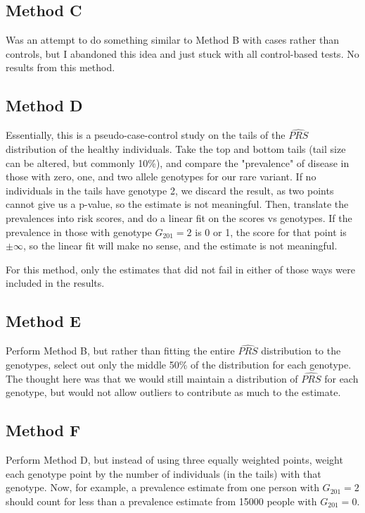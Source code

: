 \documentclass[11pt]{article} %
\begin{document}
\subsection{Method C}
Was an attempt to do something similar to Method B with cases rather than controls, but I abandoned this idea and just stuck with all control-based tests. No results from this method.

\subsection{Method D}
Essentially, this is a pseudo-case-control study on the tails of the $\widehat{PRS}$ distribution of the healthy individuals. Take the top and bottom tails (tail size can be altered, but commonly 10\%), and compare the "prevalence" of disease in those with zero, one, and two allele genotypes for our rare variant. If no individuals in the tails have genotype 2, we discard the result, as two points cannot give us a p-value, so the estimate is not meaningful. Then, translate the prevalences into risk scores, and do a linear fit on the scores vs genotypes. If the prevalence in those with genotype $G_{201} = 2$ is 0 or 1, the score for that point is $\pm \infty$, so the linear fit will make no sense, and the estimate is not meaningful.

For this method, only the estimates that did not fail in either of those ways were included in the results.

\subsection{Method E}
Perform Method B, but rather than fitting the entire $\widehat{PRS}$ distribution to the genotypes, select out only the middle 50\% of the distribution for each genotype. The thought here was that we would still maintain a distribution of $\widehat{PRS}$ for each genotype, but would not allow outliers to contribute as much to the estimate.

\subsection{Method F}
Perform Method D, but instead of using three equally weighted points, weight each genotype point by the number of individuals (in the tails) with that genotype. Now, for example, a prevalence estimate from one person with $G_{201}=2$ should count for less than a prevalence estimate from 15000 people with $G_{201}=0$.
\end{document}
